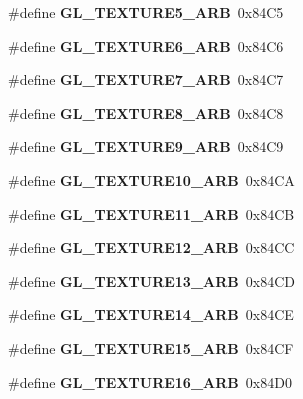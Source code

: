 \begin{DoxyCompactItemize}
\item 
\#define {\bfseries G\+L\+\_\+\+T\+E\+X\+T\+U\+R\+E5\+\_\+\+A\+R\+B}~0x84\+C5\label{_s_d_l__opengl_8h_ac11d76fda26a77a8017a9d4397f742fa}

\item 
\#define {\bfseries G\+L\+\_\+\+T\+E\+X\+T\+U\+R\+E6\+\_\+\+A\+R\+B}~0x84\+C6\label{_s_d_l__opengl_8h_a5e44a9dbcc6b13ad4564f259d6a5285d}

\item 
\#define {\bfseries G\+L\+\_\+\+T\+E\+X\+T\+U\+R\+E7\+\_\+\+A\+R\+B}~0x84\+C7\label{_s_d_l__opengl_8h_a0cb625355976404d3f15e24225beaf4a}

\item 
\#define {\bfseries G\+L\+\_\+\+T\+E\+X\+T\+U\+R\+E8\+\_\+\+A\+R\+B}~0x84\+C8\label{_s_d_l__opengl_8h_ab9964f4ef836cd122d7771e69a32fdce}

\item 
\#define {\bfseries G\+L\+\_\+\+T\+E\+X\+T\+U\+R\+E9\+\_\+\+A\+R\+B}~0x84\+C9\label{_s_d_l__opengl_8h_ade4ab7cb48946653986aea05ebca4886}

\item 
\#define {\bfseries G\+L\+\_\+\+T\+E\+X\+T\+U\+R\+E10\+\_\+\+A\+R\+B}~0x84\+C\+A\label{_s_d_l__opengl_8h_a22e31ae0c89419041f5c0f2c03d0e5ec}

\item 
\#define {\bfseries G\+L\+\_\+\+T\+E\+X\+T\+U\+R\+E11\+\_\+\+A\+R\+B}~0x84\+C\+B\label{_s_d_l__opengl_8h_aceb7a2ccaecfde6c623b84f126db07f7}

\item 
\#define {\bfseries G\+L\+\_\+\+T\+E\+X\+T\+U\+R\+E12\+\_\+\+A\+R\+B}~0x84\+C\+C\label{_s_d_l__opengl_8h_a67cfe435b4c26fb4660963eb33b170e3}

\item 
\#define {\bfseries G\+L\+\_\+\+T\+E\+X\+T\+U\+R\+E13\+\_\+\+A\+R\+B}~0x84\+C\+D\label{_s_d_l__opengl_8h_a007d7adc732a72614650b6286828e12a}

\item 
\#define {\bfseries G\+L\+\_\+\+T\+E\+X\+T\+U\+R\+E14\+\_\+\+A\+R\+B}~0x84\+C\+E\label{_s_d_l__opengl_8h_a0d9434f43e17c5e54acd60032d7b24df}

\item 
\#define {\bfseries G\+L\+\_\+\+T\+E\+X\+T\+U\+R\+E15\+\_\+\+A\+R\+B}~0x84\+C\+F\label{_s_d_l__opengl_8h_ab5b376fa3be9af7c8dca9e6796e7a467}

\item 
\#define {\bfseries G\+L\+\_\+\+T\+E\+X\+T\+U\+R\+E16\+\_\+\+A\+R\+B}~0x84\+D0\label{_s_d_l__opengl_8h_a0a7609a188daa51d92323efec12521f0}


\end{DoxyCompactItemize}
